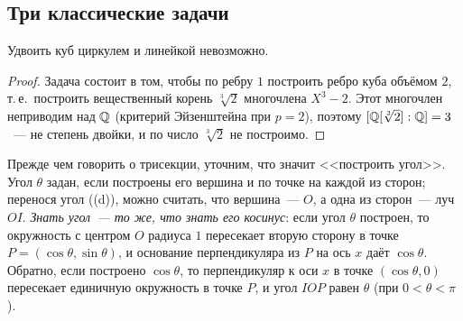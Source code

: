 \subsection*{Три классические задачи}

\begin{corollary}[1.39]
Удвоить куб циркулем и линейкой невозможно.
\end{corollary}

\begin{proof}
Задача состоит в том, чтобы по ребру $1$ построить ребро куба объёмом $2$, т.\,е.\ построить вещественный корень
$\sqrt[3]2$ многочлена $X^3-2$. Этот многочлен неприводим над $\mathbb Q$ (критерий Эйзенштейна  при $p=2$), поэтому
$[\mathbb Q[\sqrt[3]2]:\mathbb Q]=3$~--- не степень двойки, и по  число $\sqrt[3]2$ не построимо.
\end{proof}

Прежде чем говорить о трисекции, уточним, что значит <<построить угол>>. Угол $\theta$ задан, если построены его вершина
и по точке на каждой из сторон; перенося угол ((d)), можно считать, что вершина~--- $O$, а одна из
сторон~--- луч $OI$.
\emph{Знать угол~--- то же, что знать его косинус}: если угол $\theta$ построен, то окружность с центром $O$ радиуса
$1$ пересекает вторую сторону в точке $P=(\cos\theta,\sin\theta)$, и основание перпендикуляра из $P$ на ось $x$ даёт
$\cos\theta$. Обратно, если построено $\cos\theta$, то перпендикуляр к оси $x$ в точке $(\cos\theta,0)$ пересекает
единичную окружность в точке $P$, и угол $IOP$ равен $\theta$ (при $0<\theta<\pi$).

\begin{center}
\begin{keepfig}
\centering
{}
\end{keepfig}
\end{center}

